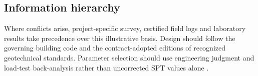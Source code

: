 \subsection{Information hierarchy}
Where conflicts arise, project-specific survey, certified field logs and laboratory results take
precedence over this illustrative basis. Design should follow the governing building code and
the contract-adopted editions of recognized geotechnical standards. Parameter selection should
use engineering judgment and load-test back-analysis rather than uncorrected SPT values alone
\cite{peck1974,bowles1996}.

